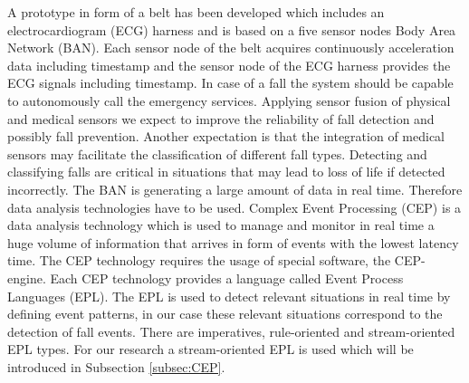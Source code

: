 \documentclass[10pt,journal,compsoc]{IEEEtran}
\begin{document}
A prototype in form of a belt has been developed which includes an electrocardiogram (ECG) harness and is based on a five sensor nodes Body Area Network (BAN). Each sensor node of the belt acquires continuously acceleration data including timestamp and the sensor node of the ECG harness provides the ECG signals including timestamp. In case of a fall the system should be capable to autonomously call the emergency services. Applying sensor fusion of physical and medical sensors we expect to improve the reliability of fall detection and possibly fall prevention. Another expectation is that the integration of medical sensors may facilitate the classification of different fall types. Detecting and classifying falls are critical in situations that may lead to loss of life if detected incorrectly. The BAN is generating a large amount of data in real time. Therefore data analysis technologies have to be used. Complex Event Processing (CEP) \cite{Esper:2016} is a data analysis technology which is used to manage and monitor in real time a huge volume of information that arrives in form of events with the lowest latency time. The CEP technology requires the usage of special software, the CEP-engine. Each CEP technology provides a language called Event Process Languages (EPL). The EPL is used to detect relevant situations in real time by defining event patterns, in our case these relevant situations correspond to the detection of fall events. There are imperatives, rule-oriented and stream-oriented EPL types. For our research a stream-oriented EPL is used which will be introduced in Subsection \ref{subsec:CEP}.
\end{document}
